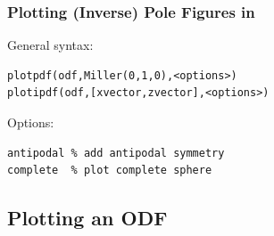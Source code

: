 \begin{frame}[fragile]
  \frametitle{Plotting (Inverse) Pole Figures in \MTEX}

  General syntax:
\begin{lstlisting}
plotpdf(odf,Miller(0,1,0),<options>)
plotipdf(odf,[xvector,zvector],<options>)
\end{lstlisting}

Options:
\begin{lstlisting}
antipodal % add antipodal symmetry
complete  % plot complete sphere
\end{lstlisting}



\end{frame}


\subsection*{Plotting an ODF}

